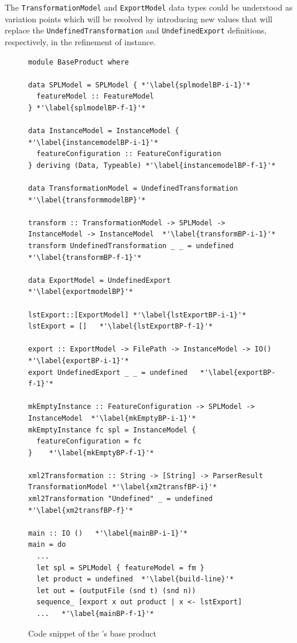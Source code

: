 
The \texttt{TransformationModel} and \texttt{ExportModel} data types could be understood as variation points which will be resolved by introducing new values ​​that will replace the \texttt{UndefinedTransformation} and \texttt{UndefinedExport} definitions, respectively, in the refinement of \hpl{} instance.


\begin{figure}
\begin{lstlisting}
module BaseProduct where

data SPLModel = SPLModel { *'\label{splmodelBP-i-1}'*
  featureModel :: FeatureModel
} *'\label{splmodelBP-f-1}'*

data InstanceModel = InstanceModel { *'\label{instancemodelBP-i-1}'*
  featureConfiguration :: FeatureConfiguration
} deriving (Data, Typeable) *'\label{instancemodelBP-f-1}'*

data TransformationModel = UndefinedTransformation *'\label{transformmodelBP}'*

transform :: TransformationModel -> SPLModel -> InstanceModel -> InstanceModel  *'\label{transformBP-i-1}'*
transform UndefinedTransformation _ _ = undefined  *'\label{transformBP-f-1}'*

data ExportModel = UndefinedExport *'\label{exportmodelBP}'*

lstExport::[ExportModel] *'\label{lstExportBP-i-1}'*
lstExport = []   *'\label{lstExportBP-f-1}'*

export :: ExportModel -> FilePath -> InstanceModel -> IO()  *'\label{exportBP-i-1}'*
export UndefinedExport _ _ = undefined   *'\label{exportBP-f-1}'*

mkEmptyInstance :: FeatureConfiguration -> SPLModel -> InstanceModel  *'\label{mkEmptyBP-i-1}'*
mkEmptyInstance fc spl = InstanceModel {
  featureConfiguration = fc
}    *'\label{mkEmptyBP-f-1}'*

xml2Transformation :: String -> [String] -> ParserResult TransformationModel *'\label{xm2transfBP-i}'*
xml2Transformation "Undefined" _ = undefined *'\label{xm2transfBP-f}'*

main :: IO ()   *'\label{mainBP-i-1}'*
main = do
  ...
  let spl = SPLModel { featureModel = fm }
  let product = undefined  *'\label{build-line}'*
  let out = (outputFile (snd t) (snd n))
  sequence_ [export x out product | x <- lstExport]
  ...   *'\label{mainBP-f-1}'*
\end{lstlisting}
\caption{Code snippet of the \hpl's base product}
\label{fig:code-hpl-base-product}
\end{figure}


